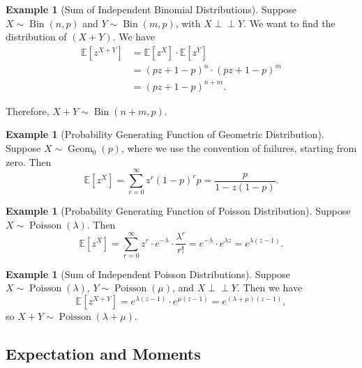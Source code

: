 \documentclass[11pt]{article}
\numberwithin{equation}{section}
\theoremstyle{definition}
\newtheorem{example}[theorem]{Example}
\theoremstyle{remark}
\newcommand{\pqty}[1]{\left(#1\right)}
\newcommand{\bqty}[1]{\left[#1\right]}
\newcommand{\Expt}{\mathbb E}
\newcommand{\indp}{\mathrel{\perp\!\!\!\perp}}
\newcommand{\Binomial}{\operatorname{Bin}}
\newcommand{\Poisson}{\operatorname{Poisson}}
\newcommand{\GeomZero}{\operatorname{Geom}_0}
\begin{document}
\begin{example}[Sum of Independent Binomial Distributions]\label{probability-example-032}
    \label{probability-ex:sum-binomial}%
    Suppose \(X \sim \Binomial\pqty{n, p}\) and \(Y \sim \Binomial\pqty{m, p}\), with \(X \indp Y\). We want to find the distribution of \(\pqty{X + Y}\). We have
    \begin{align*}
        \Expt\bqty{z^{X + Y}} &= \Expt\bqty{z^X} \cdot \Expt\bqty{z^Y} \\
        &= \pqty{pz + 1 - p}^{n} \cdot \pqty{pz + 1 - p}^{m} \\
        &= \pqty{pz + 1 - p}^{n + m}.
    \end{align*}

    Therefore, \(X + Y \sim \Binomial\pqty{n + m, p}\).
\end{example}

\begin{example}[Probability Generating Function of Geometric Distribution]\label{probability-example-033}
    \label{probability-ex:pgf-geometric}%
    Suppose \(X \sim \GeomZero\pqty{p}\), where we use the convention of failures, starting from zero. Then
    \[
        \Expt\bqty{z^X} = \sum_{r = 0}^{\infty} z^r \pqty{1 - p}^r p = \frac{p}{1 - z\pqty{1 - p}}.
    \]
\end{example}

\begin{example}[Probability Generating Function of Poisson Distribution]\label{probability-example-034}
    \label{probability-ex:pgf-poisson}%
    Suppose \(X \sim \Poisson\pqty{\lambda}\). Then
    \[
        \Expt\bqty{z^X} = \sum_{r = 0}^{\infty} z^r \cdot e^{-\lambda} \cdot \frac{\lambda^r}{r!} = e^{-\lambda} \cdot e^{\lambda z} = e^{\lambda \pqty{z - 1}}.
    \]
\end{example}

\begin{example}[Sum of Independent Poisson Distributions]\label{probability-example-035}
    Suppose \(X \sim \Poisson\pqty{\lambda}\), \(Y \sim \Poisson\pqty{\mu}\), and \(X \indp Y\). Then we have
    \[
        \Expt\bqty{z^{X + Y}} = e^{\lambda \pqty{z - 1}} \cdot e^{\mu\pqty{z - 1}} = e^{\pqty{\lambda + \mu} \pqty{z - 1}},
    \]
    so \(X + Y \sim \Poisson\pqty{\lambda + \mu}\).
\end{example}

\subsection{Expectation and Moments}
\end{document}
